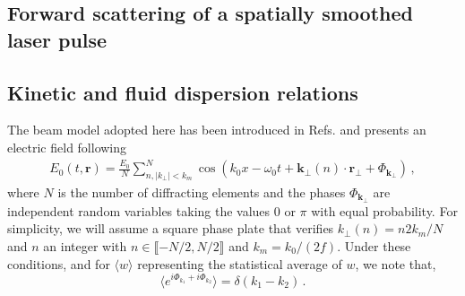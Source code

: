 \documentclass[
 reprint,
 amsmath,amssymb,
 aps,
]{revtex4-1}
\begin{document}
 \begin{widetext}
\section{Forward scattering of a spatially smoothed laser pulse}
\subsection{Kinetic and fluid dispersion relations}
The  beam model adopted here has been introduced in  Refs. \cite[]{POF_Schmitt_88,POF_Rose_93} and presents an electric field following
 \begin{align}
E_0(t,\mathbf{r})  = \frac{E_0}{N} \sum_{n,\vert k_{\perp}\vert<k_m }^N  \cos(k_0x - \omega_0t +\mathbf{k}_\perp(n) \cdot \mathbf{r}_\perp +\Phi_{\mathbf{k}_\perp})\, , \label{eq:erpp}
 \end{align}
 where  $N$ is the number of diffracting elements and the phases $\Phi_{\mathbf{k}_\perp}$ are  independent random variables taking the values $0$ or $\pi$ with equal probability.
 For simplicity, we will assume a square phase plate that verifies $k_{\perp}(n) = n2k_m/N$ and  $n$ an integer with $n\in \llbracket - N/2 ,N/2 \rrbracket$ and $k_m = k_0/(2f)$. 
 Under these conditions, and for $\langle w\rangle$ representing the statistical average of $w$,  we note   that,
 \begin{equation}\label{eq:d}
 \langle e^{i\Phi_{k_1}+i\Phi_{k_2}}\rangle=\delta(k_1-k_2) \, .
 \end{equation}


\end{widetext}
\end{document}
